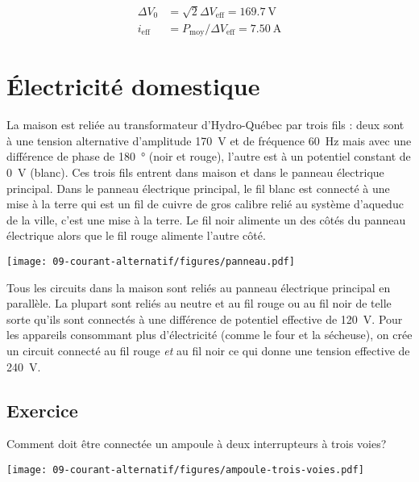\begin{align*}
  \Delta V_0 &= \sqrt{2} \Delta V_\mathrm{eff} = \SI{169.7}{\volt} \\
  i_\mathrm{eff} &= P_\mathrm{moy} / \Delta V_\mathrm{eff} = \SI{7.50}{\ampere}
\end{align*}


\section{Électricité domestique}


La maison est reliée au transformateur d'Hydro-Québec par trois fils : deux
sont à une tension alternative d'amplitude \SI{170}{V} et de fréquence
\SI{60}{Hz} mais avec une différence de phase de \SI{180}{\degree} (noir et
rouge), l'autre est
à un potentiel constant de \SI{0}{V} (blanc). Ces trois fils entrent dans
maison et dans le panneau électrique principal. Dans le panneau électrique
principal, le fil blanc est connecté à une mise à la terre qui est un fil de
cuivre de gros calibre relié au système d'aqueduc de la ville, c'est une mise à
la terre. Le fil noir alimente un des côtés du panneau électrique alors que
le fil rouge alimente l'autre côté.

\begin{center}
  \texttt{[image: 09-courant-alternatif/figures/panneau.pdf]}
\end{center}

Tous les circuits dans la maison sont reliés au panneau électrique principal en
parallèle. La plupart sont reliés au neutre et au fil rouge ou au fil noir de
telle sorte qu'ils sont connectés à une différence de potentiel effective
de \SI{120}{V}. Pour les appareils consommant plus d'électricité (comme le four
et la sécheuse), on crée un circuit connecté au fil rouge \textit{et} au fil
noir ce qui donne une tension effective de \SI{240}{V}.


\subsection*{Exercice}

Comment doit être connectée un ampoule à deux interrupteurs à trois voies?
\begin{center}
  \texttt{[image: 09-courant-alternatif/figures/ampoule-trois-voies.pdf]}
\end{center}


